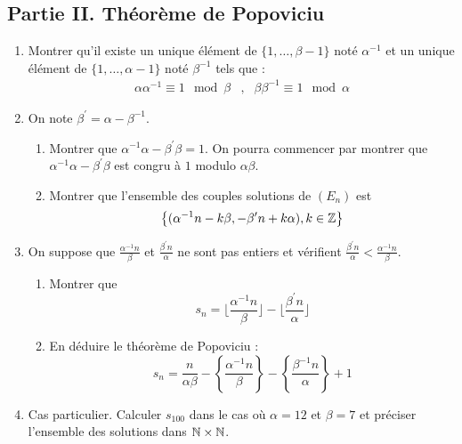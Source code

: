 \subsection*{Partie II. Théorème de Popoviciu}
\begin{enumerate}
 \item Montrer qu'il existe un unique élément de $\{1,\dots,\beta -1\}$ noté $\alpha ^{-1}$ et un unique élément de $\{1,\dots,\alpha -1\}$ noté $\beta ^{-1}$ tels que :
\begin{align*}
 \alpha \alpha^{-1}\equiv 1 \mod \beta &,& \beta \beta^{-1}\equiv 1 \mod \alpha
\end{align*}

\item On note $\beta^\prime = \alpha -\beta^{-1}$.
\begin{enumerate}
 \item Montrer que $\alpha^{-1}\alpha -\beta^\prime \beta =1$. On pourra commencer par montrer que $\alpha^{-1}\alpha -\beta^\prime \beta$ est congru à $1$ modulo $\alpha \beta$.

 \item Montrer que l'ensemble des couples solutions de $(E_n)$ est
\begin{displaymath}
 \left\lbrace (\alpha^{-1}n-k\beta,-\beta^\prime n + k\alpha ), k\in \mathbb{Z} \right\rbrace 
\end{displaymath}
\end{enumerate}

\item On suppose que $\frac{\alpha^{-1}n}{\beta}$ et $\frac{\beta^\prime n}{\alpha}$ ne sont pas entiers et vérifient $\frac{\beta^\prime n}{\alpha} < \frac{\alpha^{-1}n}{\beta}$.
\begin{enumerate}
\item Montrer que 
\begin{displaymath}
 s_n = \lfloor\frac{\alpha^{-1}n}{\beta} \rfloor - \lfloor\frac{\beta^\prime n}{\alpha} \rfloor
\end{displaymath}
\item En déduire le théorème de Popoviciu :
\begin{displaymath}
 s_n = \frac{n}{\alpha \beta} -\left\lbrace \frac{\alpha^{-1}n}{\beta} \right\rbrace  - \left\lbrace \frac{\beta^{-1} n}{\alpha} \right\rbrace  +1
\end{displaymath}
\end{enumerate}
\item Cas particulier. Calculer $s_{100}$ dans le cas où $\alpha=12$ et $\beta=7$ et préciser l'ensemble des solutions dans $\mathbb{N}\times\mathbb{N}$.
\end{enumerate}

